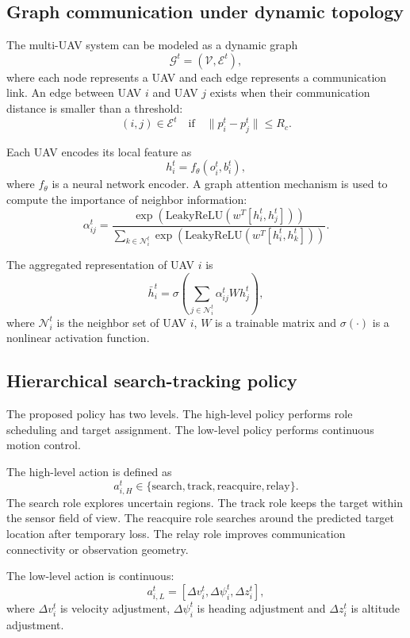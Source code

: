 \documentclass[14pt,a4paper]{extarticle}
\begin{document}
\subsection{Graph communication under dynamic topology}

The multi-UAV system can be modeled as a dynamic graph
\[
\mathcal{G}^t=(\mathcal{V},\mathcal{E}^t),
\]
where each node represents a UAV and each edge represents a communication link. An edge between UAV $i$ and UAV $j$ exists when their communication distance is smaller than a threshold:
\[
(i,j)\in \mathcal{E}^t \quad \text{if} \quad \|p_i^t-p_j^t\|\leq R_c.
\]

Each UAV encodes its local feature as
\[
h_i^t=f_{\theta}(o_i^t,b_i^t),
\]
where $f_{\theta}$ is a neural network encoder. A graph attention mechanism is used to compute the importance of neighbor information:
\begin{equation}
  \alpha_{ij}^t=
  \frac{\exp(\text{LeakyReLU}(w^T[h_i^t,h_j^t]))}
  {\sum_{k\in \mathcal{N}_i^t}\exp(\text{LeakyReLU}(w^T[h_i^t,h_k^t]))}.
\end{equation}

The aggregated representation of UAV $i$ is
\begin{equation}
  \bar{h}_i^t=\sigma\left(\sum_{j\in \mathcal{N}_i^t}\alpha_{ij}^t W h_j^t\right),
\end{equation}
where $\mathcal{N}_i^t$ is the neighbor set of UAV $i$, $W$ is a trainable matrix and $\sigma(\cdot)$ is a nonlinear activation function.

\subsection{Hierarchical search-tracking policy}

The proposed policy has two levels. The high-level policy performs role scheduling and target assignment. The low-level policy performs continuous motion control.

The high-level action is defined as
\[
a_{i,H}^t \in \{\text{search},\text{track},\text{reacquire},\text{relay}\}.
\]
The search role explores uncertain regions. The track role keeps the target within the sensor field of view. The reacquire role searches around the predicted target location after temporary loss. The relay role improves communication connectivity or observation geometry.

The low-level action is continuous:
\[
a_{i,L}^t=[\Delta v_i^t,\Delta \psi_i^t,\Delta z_i^t],
\]
where $\Delta v_i^t$ is velocity adjustment, $\Delta \psi_i^t$ is heading adjustment and $\Delta z_i^t$ is altitude adjustment.
\end{document}

